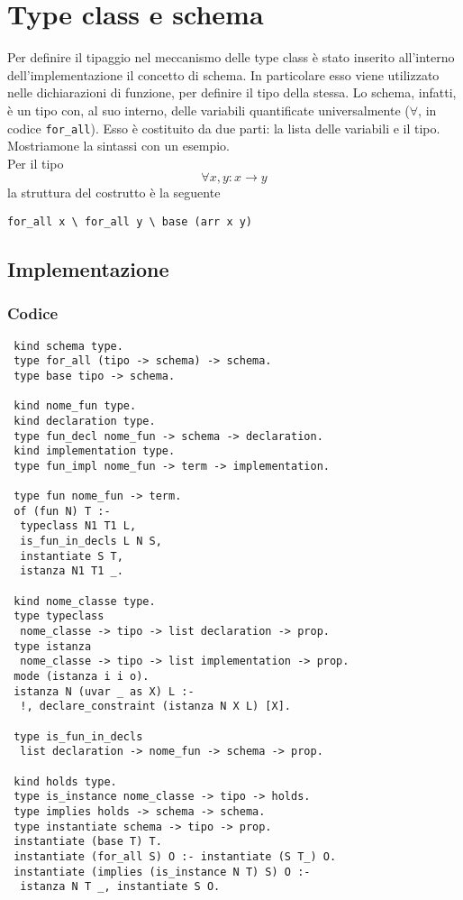 \documentclass[12pt,a4paper,openright,twoside]{report}
\begin{document}
\section{Type class e schema}
Per definire il tipaggio nel meccanismo delle type class è stato inserito all'interno dell'implementazione il concetto di schema. In particolare esso viene utilizzato nelle dichiarazioni di funzione, per definire il tipo della stessa. Lo schema, infatti, è un tipo con, al suo interno, delle variabili quantificate universalmente ($\forall$, in codice \verb"for_all"). Esso è costituito da due parti: la lista delle variabili e il tipo.\\
Mostriamone la sintassi con un esempio.\\
Per il tipo
\begin{equation}
 \forall x,y : x \rightarrow y \label{eq:fax->y}
\end{equation}
la struttura del costrutto è la seguente
\begin{center}
 \verb"for_all x \ for_all y \ base (arr x y)"
\end{center}

\subsection{Implementazione}

\subsubsection{Codice}
\begin{verbatim}
 kind schema type.
 type for_all (tipo -> schema) -> schema.
 type base tipo -> schema.
 
 kind nome_fun type.
 kind declaration type.
 type fun_decl nome_fun -> schema -> declaration.
 kind implementation type.
 type fun_impl nome_fun -> term -> implementation.
 
 type fun nome_fun -> term.
 of (fun N) T :-
  typeclass N1 T1 L,
  is_fun_in_decls L N S,
  instantiate S T,
  istanza N1 T1 _.
 
 kind nome_classe type.
 type typeclass
  nome_classe -> tipo -> list declaration -> prop.
 type istanza
  nome_classe -> tipo -> list implementation -> prop.
 mode (istanza i i o).
 istanza N (uvar _ as X) L :-
  !, declare_constraint (istanza N X L) [X].
 
 type is_fun_in_decls
  list declaration -> nome_fun -> schema -> prop.
 
 kind holds type.
 type is_instance nome_classe -> tipo -> holds.
 type implies holds -> schema -> schema.
 type instantiate schema -> tipo -> prop.
 instantiate (base T) T.
 instantiate (for_all S) O :- instantiate (S T_) O.
 instantiate (implies (is_instance N T) S) O :-
  istanza N T _, instantiate S O.
\end{verbatim}
\end{document}

